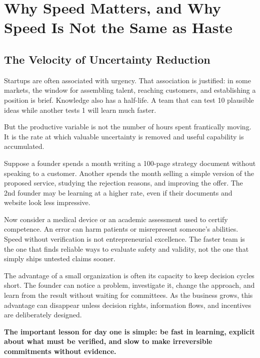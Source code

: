 \section{Why Speed Matters, and Why Speed Is Not the Same as Haste}

\subsection{The Velocity of Uncertainty Reduction}

Startups are often associated with urgency. That association is justified: in some markets, the window for assembling talent, reaching customers, and establishing a position is brief. Knowledge also has a half-life. A team that can test 10 plausible ideas while another tests 1 will learn much faster.

But the productive variable is not the number of hours spent frantically moving. It is the rate at which valuable uncertainty is removed and useful capability is accumulated.

Suppose a founder spends a month writing a 100-page strategy document without speaking to a customer. Another spends the month selling a simple version of the proposed service, studying the rejection reasons, and improving the offer. The 2nd founder may be learning at a higher rate, even if their documents and website look less impressive.

Now consider a medical device or an academic assessment used to certify competence. An error can harm patients or misrepresent someone's abilities. Speed without verification is not entrepreneurial excellence. The faster team is the one that finds reliable ways to evaluate safety and validity, not the one that simply ships untested claims sooner.

The advantage of a small organization is often its capacity to keep decision cycles short. The founder can notice a problem, investigate it, change the approach, and learn from the result without waiting for committees. As the business grows, this advantage can disappear unless decision rights, information flows, and incentives are deliberately designed.

\textbf{The important lesson for day one is simple: be fast in learning, explicit about what must be verified, and slow to make irreversible commitments without evidence.}
